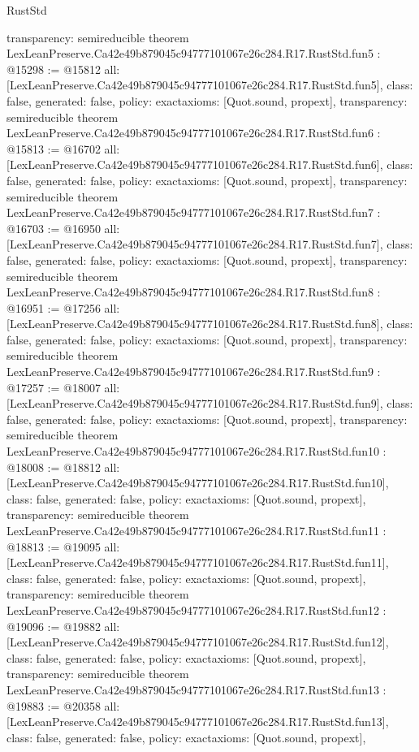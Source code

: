 \begin{lexlean}{RustStd}
\begin{coremodule}
{  transparency: semireducible
}
theorem LexLeanPreserve.Ca42e49b879045c94777101067e26c284.R17.RustStd.fun5 : @15298 := @15812 {
  all: [LexLeanPreserve.Ca42e49b879045c94777101067e26c284.R17.RustStd.fun5],
  class: false,
  generated: false,
  policy: exact{axioms: [Quot.sound, propext]},
  transparency: semireducible
}
theorem LexLeanPreserve.Ca42e49b879045c94777101067e26c284.R17.RustStd.fun6 : @15813 := @16702 {
  all: [LexLeanPreserve.Ca42e49b879045c94777101067e26c284.R17.RustStd.fun6],
  class: false,
  generated: false,
  policy: exact{axioms: [Quot.sound, propext]},
  transparency: semireducible
}
theorem LexLeanPreserve.Ca42e49b879045c94777101067e26c284.R17.RustStd.fun7 : @16703 := @16950 {
  all: [LexLeanPreserve.Ca42e49b879045c94777101067e26c284.R17.RustStd.fun7],
  class: false,
  generated: false,
  policy: exact{axioms: [Quot.sound, propext]},
  transparency: semireducible
}
theorem LexLeanPreserve.Ca42e49b879045c94777101067e26c284.R17.RustStd.fun8 : @16951 := @17256 {
  all: [LexLeanPreserve.Ca42e49b879045c94777101067e26c284.R17.RustStd.fun8],
  class: false,
  generated: false,
  policy: exact{axioms: [Quot.sound, propext]},
  transparency: semireducible
}
theorem LexLeanPreserve.Ca42e49b879045c94777101067e26c284.R17.RustStd.fun9 : @17257 := @18007 {
  all: [LexLeanPreserve.Ca42e49b879045c94777101067e26c284.R17.RustStd.fun9],
  class: false,
  generated: false,
  policy: exact{axioms: [Quot.sound, propext]},
  transparency: semireducible
}
theorem LexLeanPreserve.Ca42e49b879045c94777101067e26c284.R17.RustStd.fun10 : @18008 := @18812 {
  all: [LexLeanPreserve.Ca42e49b879045c94777101067e26c284.R17.RustStd.fun10],
  class: false,
  generated: false,
  policy: exact{axioms: [Quot.sound, propext]},
  transparency: semireducible
}
theorem LexLeanPreserve.Ca42e49b879045c94777101067e26c284.R17.RustStd.fun11 : @18813 := @19095 {
  all: [LexLeanPreserve.Ca42e49b879045c94777101067e26c284.R17.RustStd.fun11],
  class: false,
  generated: false,
  policy: exact{axioms: [Quot.sound, propext]},
  transparency: semireducible
}
theorem LexLeanPreserve.Ca42e49b879045c94777101067e26c284.R17.RustStd.fun12 : @19096 := @19882 {
  all: [LexLeanPreserve.Ca42e49b879045c94777101067e26c284.R17.RustStd.fun12],
  class: false,
  generated: false,
  policy: exact{axioms: [Quot.sound, propext]},
  transparency: semireducible
}
theorem LexLeanPreserve.Ca42e49b879045c94777101067e26c284.R17.RustStd.fun13 : @19883 := @20358 {
  all: [LexLeanPreserve.Ca42e49b879045c94777101067e26c284.R17.RustStd.fun13],
  class: false,
  generated: false,
  policy: exact{axioms: [Quot.sound, propext]},
}
\end{coremodule}
\end{lexlean}
